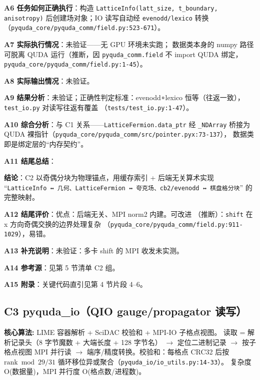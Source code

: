 \documentclass[UTF8]{ctexart}
\begin{document}
\textbf{A6 任务如何正确执行}：构造 \texttt{LatticeInfo(latt\_size, t\_boundary,
anisotropy)} 后创建场对象；IO 读写自动经 \texttt{evenodd/lexico} 转换
（\texttt{\nolinkurl{pyquda_core/pyquda_comm/field.py:523-671}}）。

\textbf{A7 实际执行情况}：\textcolor{warn}{未验证}——无 GPU 环境未实跑；
数据类本身的 numpy 路径可脱离 QUDA 运行（\textcolor{phys}{推断}，因
\texttt{pyquda\_comm.field} 不 import QUDA 绑定，\texttt{\nolinkurl{pyquda_core/pyquda_comm/field.py:1-45}}）。

\textbf{A8 实际输出情况}：\textcolor{warn}{未验证}。

\textbf{A9 结果分析}：\textcolor{warn}{未验证}；正确性判定标准：evenodd∘lexico
恒等（往返一致），\texttt{test\_io.py} 对读写往返有覆盖
（\texttt{\nolinkurl{tests/test_io.py:1-47}}）。

\textbf{A10 综合分析}：与 C1 关系——\texttt{LatticeFermion.data\_ptr} 经
\texttt{\_NDArray} 桥接为 QUDA 裸指针（\texttt{\nolinkurl{pyquda_core/pyquda_comm/src/pointer.pyx:73-137}}），
数据类即是绑定层的“内存契约”。

\textbf{A11 结尾总结}：
\begin{conclbox}
\textbf{结论}：C2 以奇偶分块为物理锚点，用缓存索引 + 后端无关算术实现
“\texttt{LatticeInfo ↔ 几何、LatticeFermion ↔ 夸克场、cb2/evenodd ↔ 棋盘格分块}”
的完整映射。
\end{conclbox}

\textbf{A12 结尾评价}：优点：后端无关、MPI norm2 内建。可改进
（\textcolor{phys}{推断}）：\texttt{shift} 在 x 方向奇偶交换的边界处理复杂
（\texttt{\nolinkurl{pyquda_core/pyquda_comm/field.py:911-1029}}），易错。

\textbf{A13 补充说明}：\textcolor{warn}{未验证}：多卡 shift 的 MPI 收发未实测。

\textbf{A14 参考源}：见第 5 节清单 C2 组。

\textbf{A15 附录}：关键代码直引见第 4 节片段 4–6。

\subsection{C3 pyquda\_io（QIO gauge/propagator 读写）}

\begin{algobox}
\textbf{核心算法:} LIME 容器解析 + SciDAC 校验和 + MPI-IO 子格点视图。
读取 = 解析记录头（8 字节魔数 + 大端长度 + 128 字节名） $\rightarrow$  定位二进制记录  $\rightarrow$ 
按子格点视图 MPI 并行读  $\rightarrow$  端序/精度转换。校验和：每格点 CRC32 后按
$\mathrm{rank}\bmod 29/31$ 循环移位异或聚合（\texttt{\nolinkurl{pyquda_io/io_utils.py:14-33}}）。
复杂度 O(数据量)，MPI 并行度 O(格点数/进程数)。
\end{algobox}
\end{document}
